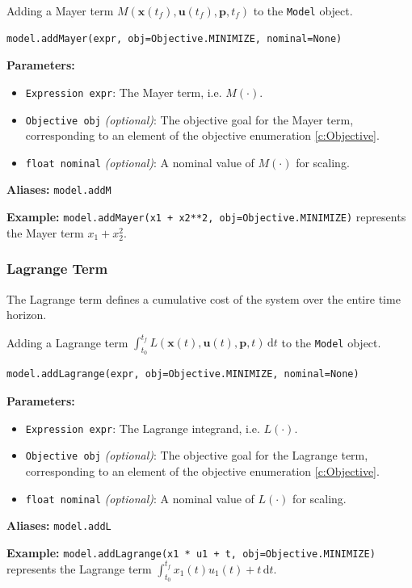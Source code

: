 \documentclass[12pt]{article}
\renewcommand{\v}{\bm}
\begin{document}
	\begin{mdframed}[backgroundcolor=gray!10, roundcorner=10pt, linewidth=1pt]
		
		Adding a Mayer term $M(\v{x}(t_f), \v{u}(t_f), \v{p}, t_f)$ to the \texttt{Model} object.
		
		\begin{lstlisting}
model.addMayer(expr, obj=Objective.MINIMIZE, nominal=None)
		\end{lstlisting}
		\label{addMayer}
		\textbf{Parameters:}
		\begin{itemize} 
			\item \texttt{Expression expr}: The Mayer term, i.e. $M(\cdot)$.
			\item \texttt{Objective obj} \emph{(optional)}: The objective goal for the Mayer term, corresponding to an element of the objective enumeration \ref{c:Objective}.
			\item \texttt{float nominal} \emph{(optional)}: A nominal value of $M(\cdot)$ for scaling.
		\end{itemize}
		
		\textbf{Aliases:}  \texttt{model.addM}
		
		\textbf{Example:} \texttt{model.addMayer(x1 + x2**2, obj=Objective.MINIMIZE)} represents the Mayer term
		$x_1 + x_2^2$.
	\end{mdframed}

	\subsubsection{Lagrange Term}
		
	 The Lagrange term defines a cumulative cost of the system over the entire time horizon.
	 
	 \begin{mdframed}[backgroundcolor=gray!10, roundcorner=10pt, linewidth=1pt]
	 	
	 	Adding a Lagrange term $\int_{t_0}^{t_f} L(\v{x}(t), \v{u}(t), \v{p}, t) \, \mathrm{d}t$ to the \texttt{Model} object.
	 	
	 	\begin{lstlisting}
model.addLagrange(expr, obj=Objective.MINIMIZE, nominal=None)
	 	\end{lstlisting}
	 	\label{addLagrange}
	 	\textbf{Parameters:}
	 	\begin{itemize} 
	 		\item \texttt{Expression expr}: The Lagrange integrand, i.e. $L(\cdot)$.
	 		\item \texttt{Objective obj} \emph{(optional)}: The objective goal for the Lagrange term, corresponding to an element of the objective enumeration \ref{c:Objective}.
	 		\item \texttt{float nominal} \emph{(optional)}: A nominal value of $L(\cdot)$ for scaling.
	 	\end{itemize}
	 	
	 	\textbf{Aliases:}  \texttt{model.addL}
	 	
	 	\textbf{Example:} \texttt{model.addLagrange(x1 * u1 + t, obj=Objective.MINIMIZE)} represents the Lagrange term
	 	$\int_{t_0}^{t_f} x_1(t) u_1(t) + t \, \mathrm{d}t$.
	 \end{mdframed}
	 
\end{document}
